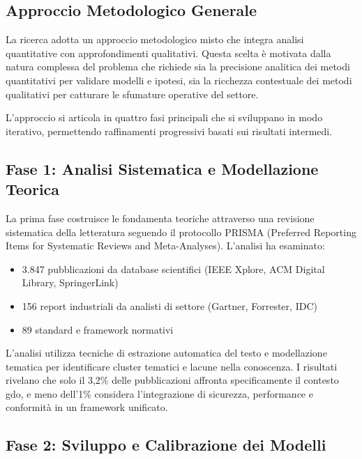 \subsection{\texorpdfstring{\textbf{Approccio Metodologico Generale}}{1.5.1 - Approccio Metodologico Generale}}
\label{subsec:approccio_metodologico}

La ricerca adotta un approccio metodologico misto che integra analisi quantitative con approfondimenti qualitativi. Questa scelta è motivata dalla natura complessa del problema che richiede sia la precisione analitica dei metodi quantitativi per validare modelli e ipotesi, sia la ricchezza contestuale dei metodi qualitativi per catturare le sfumature operative del settore.

L'approccio si articola in quattro fasi principali che si sviluppano in modo iterativo, permettendo raffinamenti progressivi basati sui risultati intermedi.

\subsection{\texorpdfstring{\textbf{Fase 1: Analisi Sistematica e Modellazione Teorica}}{1.5.2 - Fase 1: Analisi Sistematica e Modellazione Teorica}}
\label{subsec:fase1}

La prima fase costruisce le fondamenta teoriche attraverso una revisione sistematica della letteratura seguendo il protocollo PRISMA (Preferred Reporting Items for Systematic Reviews and Meta-Analyses). L'analisi ha esaminato:
\begin{itemize}
\item 3.847 pubblicazioni da database scientifici (IEEE Xplore, ACM Digital Library, SpringerLink)
\item 156 report industriali da analisti di settore (Gartner, Forrester, IDC)
\item 89 standard e framework normativi
\end{itemize}

L'analisi utilizza tecniche di estrazione automatica del testo e modellazione tematica per identificare cluster tematici e lacune nella conoscenza. I risultati rivelano che solo il 3,2\% delle pubblicazioni affronta specificamente il contesto \gls{gdo}, e meno dell'1\% considera l'integrazione di sicurezza, performance e conformità in un framework unificato.

\subsection{\texorpdfstring{\textbf{Fase 2: Sviluppo e Calibrazione dei Modelli}}{1.5.3 - Fase 2: Sviluppo e Calibrazione dei Modelli}}
\label{subsec:fase2}

